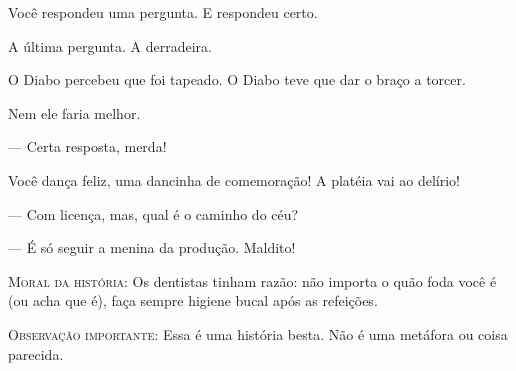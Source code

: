 Você respondeu uma pergunta. E respondeu certo.

A última pergunta. A derradeira.

O Diabo percebeu que foi tapeado. O Diabo teve que dar o braço a torcer.

Nem ele faria melhor.

--- Certa resposta, merda!

Você dança feliz, uma dancinha de comemoração! A platéia vai ao delírio!

--- Com licença, mas, qual é o caminho do céu?

--- É só seguir a menina da produção. Maldito!

\textsc{Moral da história}: Os dentistas tinham razão: não importa o quão foda você é (ou acha que é), faça sempre higiene bucal após as refeições.

\textsc{Observação importante}: Essa é uma história besta. Não é uma metáfora ou coisa parecida.
